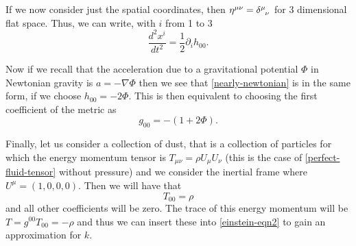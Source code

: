 If we now consider just the spatial coordinates, then \(\eta^{\mu \nu} = \delta\indices{^\mu_\nu}\) for 3 dimensional flat space. Thus, we can write, with \(i\) from 1 to 3
\begin{equation} \label{nearly-newtonian}
	\frac{d^2 x^i}{d t^2} = \frac{1}{2} \partial_{i} h_{00} .
\end{equation}

Now if we recall that the acceleration due to a gravitational potential \(\Phi\) in Newtonian gravity is \(a = - \nabla \Phi\) then we see that \eqref{nearly-newtonian} is in the same form, if we choose \(h_{00} = - 2 \Phi\). This is then equivalent to choosing the first coefficient of the metric as \cite{carroll}
\begin{equation} \label{metric-newtonian}
	g_{00} = - (1 + 2 \Phi) .
\end{equation}

Finally, let us consider a collection of dust, that is a collection of particles for which the energy momentum tensor is \(T_{\mu \nu} = \rho U_{\mu} U_{\nu}\) (this is the case of \eqref{perfect-fluid-tensor} without pressure) and we consider the inertial frame where \(U^{\mu} = (1, 0, 0, 0)\). Then we will have that \cite{carroll, cheng}
\begin{equation} \label{dust-emt}
	T_{00} = \rho
\end{equation}
and all other coefficients will be zero. The trace of this energy momentum will be \(T = g^{00} T_{00} = - \rho\) and thus we can insert these into \eqref{einstein-eqn2} to gain an approximation for \(k\).

